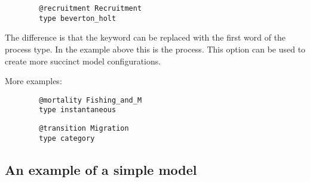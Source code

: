 {\small{\begin{verbatim}
		@recruitment Recruitment
		type beverton_holt
		\end{verbatim}}}

The difference is that the keyword  can be replaced with the first word of the process type. In the example above this is the  process. This option can be used to create more succinct model configurations.

More examples:

{\small{\begin{verbatim}
		@mortality Fishing_and_M
		type instantaneous
		\end{verbatim}}}

{\small{\begin{verbatim}
		@transition Migration
		type category
		\end{verbatim}}}

\subsection{An example of a simple model\label{example1}}




%


